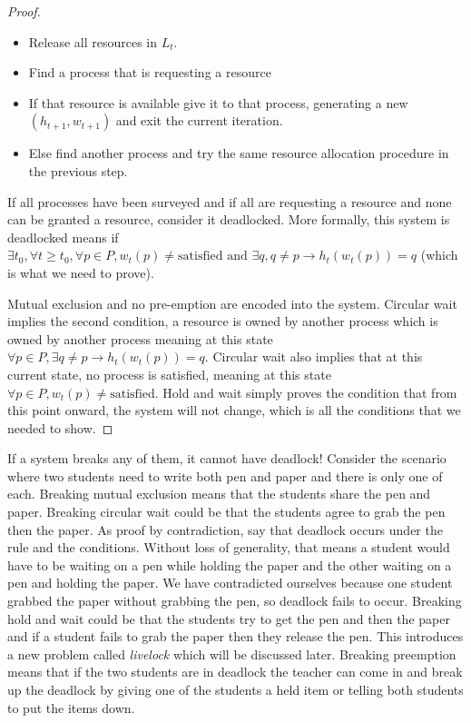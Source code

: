 \begin{proof}
	\begin{itemize}
		\item Release all resources in $L_t$.
		\item Find a process that is requesting a resource
		\item If that resource is available give it to that process, generating a new $(h_{t+1}, w_{t+1})$ and exit the current iteration.
		\item Else find another process and try the same resource allocation procedure in the previous step.
	\end{itemize}
	
	If all processes have been surveyed and if all are requesting a resource and none can be granted a resource, consider it deadlocked.
	More formally, this system is deadlocked means if $\exists t_0, \forall t \geq t_0, \forall p \in P, w_t(p) \neq \text{satisfied} \text{ and } \exists q, q \neq p \rightarrow h_t(w_t(p)) = q$ (which is what we need to prove).
	
	Mutual exclusion and no pre-emption are encoded into the system.
	Circular wait implies the second condition, a resource is owned by another process which is owned by another process meaning at this state $\forall p \in P, \exists q \neq p \rightarrow h_t(w_t(p)) = q$.
	Circular wait also implies that at this current state, no process is satisfied, meaning at this state $\forall p \in P, w_t(p) \neq \text{satisfied}$.
	Hold and wait simply proves the condition that from this point onward, the system will not change, which is all the conditions that we needed to show.
\end{proof}

If a system breaks any of them, it cannot have deadlock!
Consider the scenario where two students need to write both pen and paper and there is only one of each.
Breaking mutual exclusion means that the students share the pen and paper.
Breaking circular wait could be that the students agree to grab the pen then the paper.
As proof by contradiction, say that deadlock occurs under the rule and the conditions.
Without loss of generality, that means a student would have to be waiting on a pen while holding the paper and the other waiting on a pen and holding the paper.
We have contradicted ourselves because one student grabbed the paper without grabbing the pen, so deadlock fails to occur.
Breaking hold and wait could be that the students try to get the pen and then the paper and if a student fails to grab the paper then they release the pen.
This introduces a new problem called \textit{livelock} which will be discussed later.
Breaking preemption means that if the two students are in deadlock the teacher can come in and break up the deadlock by giving one of the students a held item or telling both students to put the items down.

